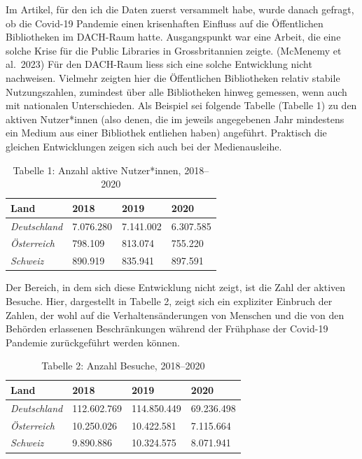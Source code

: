 \documentclass[a4paper,
fontsize=11pt,
oneside,
numbers=noperiodatend,
parskip=half-,
bibliography=totoc,
final
]{scrartcl}
\begin{document}
Im Artikel, für den ich die Daten zuerst versammelt habe, wurde danach
gefragt, ob die Covid-19 Pandemie einen krisenhaften Einfluss auf die
Öffentlichen Bibliotheken im DACH-Raum hatte. Ausgangspunkt war eine
Arbeit, die eine solche Krise für die Public Libraries in
Grossbritannien zeigte. (McMenemy et al.~2023) Für den DACH-Raum liess
sich eine solche Entwicklung nicht nachweisen. Vielmehr zeigten hier die
Öffentlichen Bibliotheken relativ stabile Nutzungszahlen, zumindest über
alle Bibliotheken hinweg gemessen, wenn auch mit nationalen
Unterschieden. Als Beispiel sei folgende Tabelle (Tabelle 1) zu den
aktiven Nutzer*innen (also denen, die im jeweils angegebenen Jahr
mindestens ein Medium aus einer Bibliothek entliehen haben) angeführt.
Praktisch die gleichen Entwicklungen zeigen sich auch bei der
Medienausleihe.

\begin{table}[]\centering
\begin{tabular}{|l|l|l|l|}
\hline
\textbf{Land}        & \textbf{2018} & \textbf{2019} & \textbf{2020} \\ \hline
\textit{Deutschland} & 7.076.280     & 7.141.002     & 6.307.585     \\ \hline
\textit{Österreich}  & 798.109       & 813.074       & 755.220       \\ \hline
\textit{Schweiz}     & 890.919       & 835.941       & 897.591       \\ \hline
\end{tabular}
\caption{Tabelle 1: Anzahl aktive Nutzer*innen, 2018--2020}
\end{table}

Der Bereich, in dem sich diese Entwicklung nicht zeigt, ist die Zahl der
aktiven Besuche. Hier, dargestellt in Tabelle 2, zeigt sich ein
expliziter Einbruch der Zahlen, der wohl auf die Verhaltensänderungen
von Menschen und die von den Behörden erlassenen Beschränkungen während
der Frühphase der Covid-19 Pandemie zurückgeführt werden können.

\begin{table}[]\centering
\begin{tabular}{|l|l|l|l|}
\hline
\textbf{Land} & \textbf{2018} & \textbf{2019} & \textbf{2020} \\ \hline
\textit{Deutschland}   & 112.602.769   & 114.850.449   & 69.236.498    \\ \hline
\textit{Österreich}    & 10.250.026    & 10.422.581    & 7.115.664     \\ \hline
\textit{Schweiz}       & 9.890.886     & 10.324.575    & 8.071.941     \\ \hline
\end{tabular}
\caption{Tabelle 2: Anzahl Besuche, 2018--2020}
\end{table}
\end{document}
